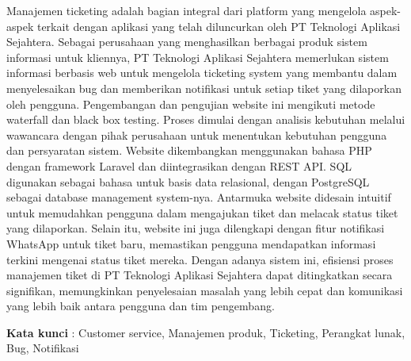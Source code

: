 \documentclass[12pt]{article}
\begin{document}
\noindent Manajemen ticketing adalah bagian integral dari platform yang mengelola aspek-aspek terkait dengan aplikasi yang telah diluncurkan oleh PT Teknologi Aplikasi Sejahtera. Sebagai perusahaan yang menghasilkan berbagai produk sistem informasi untuk kliennya, PT Teknologi Aplikasi Sejahtera memerlukan sistem informasi berbasis web untuk mengelola ticketing system yang membantu dalam menyelesaikan bug dan memberikan notifikasi untuk setiap tiket yang dilaporkan oleh pengguna. Pengembangan dan pengujian website ini mengikuti metode waterfall dan black box testing. Proses dimulai dengan analisis kebutuhan melalui wawancara dengan pihak perusahaan untuk menentukan kebutuhan pengguna dan persyaratan sistem. Website dikembangkan menggunakan bahasa PHP dengan framework Laravel dan diintegrasikan dengan REST API. SQL digunakan sebagai bahasa untuk basis data relasional, dengan PostgreSQL sebagai database management system-nya. Antarmuka website didesain intuitif untuk memudahkan pengguna dalam mengajukan tiket dan melacak status tiket yang dilaporkan. Selain itu, website ini juga dilengkapi dengan fitur notifikasi WhatsApp untuk tiket baru, memastikan pengguna mendapatkan informasi terkini mengenai status tiket mereka. Dengan adanya sistem ini, efisiensi proses manajemen tiket di PT Teknologi Aplikasi Sejahtera dapat ditingkatkan secara signifikan, memungkinkan penyelesaian masalah yang lebih cepat dan komunikasi yang lebih baik antara pengguna dan tim pengembang.

\vspace*{1cm}
\noindent \textbf{Kata kunci} : Customer service, Manajemen produk, Ticketing, Perangkat lunak, Bug, Notifikasi

\newpage

\end{document}
